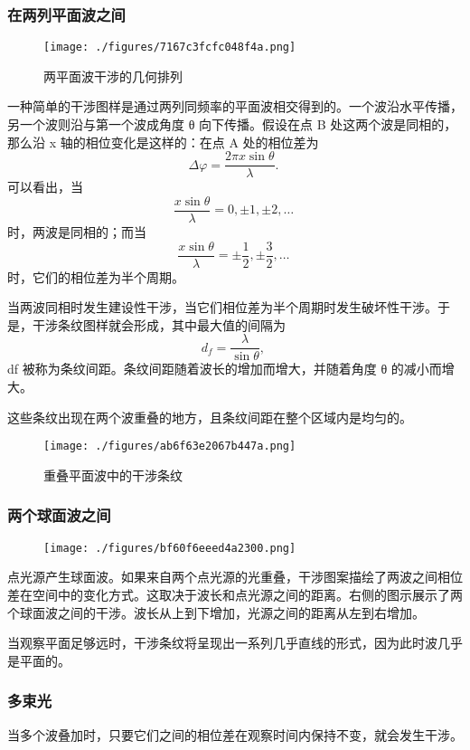 \subsubsection{在两列平面波之间}
\begin{figure}[ht]
\centering
\texttt{[image: ./figures/7167c3fcfc048f4a.png]}
\caption{两平面波干涉的几何排列} \label{fig_GSWLX_6}
\end{figure}
一种简单的干涉图样是通过两列同频率的平面波相交得到的。一个波沿水平传播，另一个波则沿与第一个波成角度 θ 向下传播。假设在点 B 处这两个波是同相的，那么沿 x 轴的相位变化是这样的：在点 A 处的相位差为
\[
\Delta \varphi = \frac{2\pi x \sin \theta}{\lambda}.~
\]
可以看出，当
\[
\frac{x \sin \theta}{\lambda} = 0, \pm 1, \pm 2, \ldots~
\]
时，两波是同相的；而当
\[
\frac{x \sin \theta}{\lambda} = \pm \frac{1}{2}, \pm \frac{3}{2}, \ldots~
\]
时，它们的相位差为半个周期。

当两波同相时发生建设性干涉，当它们相位差为半个周期时发生破坏性干涉。于是，干涉条纹图样就会形成，其中最大值的间隔为
\[
d_f = \frac{\lambda}{\sin \theta},~
\]
df 被称为条纹间距。条纹间距随着波长的增加而增大，并随着角度 θ 的减小而增大。

这些条纹出现在两个波重叠的地方，且条纹间距在整个区域内是均匀的。
\begin{figure}[ht]
\centering
\texttt{[image: ./figures/ab6f63e2067b447a.png]}
\caption{重叠平面波中的干涉条纹} \label{fig_GSWLX_7}
\end{figure}
\subsubsection{两个球面波之间}
\begin{figure}[ht]
\centering
\texttt{[image: ./figures/bf60f6eeed4a2300.png]}
\caption{} \label{fig_GSWLX_8}
\end{figure}
点光源产生球面波。如果来自两个点光源的光重叠，干涉图案描绘了两波之间相位差在空间中的变化方式。这取决于波长和点光源之间的距离。右侧的图示展示了两个球面波之间的干涉。波长从上到下增加，光源之间的距离从左到右增加。

当观察平面足够远时，干涉条纹将呈现出一系列几乎直线的形式，因为此时波几乎是平面的。

\subsubsection{多束光}

当多个波叠加时，只要它们之间的相位差在观察时间内保持不变，就会发生干涉。

